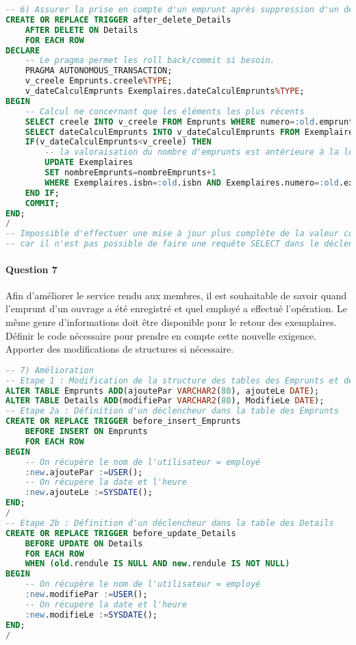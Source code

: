 \documentclass[10pt, oneside]{article}
\begin{document}
\begin{lstlisting}[language=sql, title=Question 6, label=QVI6]
-- 6) Assurer la prise en compte d'un emprunt après suppression d'un détail
CREATE OR REPLACE TRIGGER after_delete_Details
	AFTER DELETE ON Details
	FOR EACH ROW
DECLARE
	-- Le pragma permet les roll back/commit si besoin.
	PRAGMA AUTONOMOUS_TRANSACTION;
	v_creele Emprunts.creele%TYPE;
	v_dateCalculEmprunts Exemplaires.dateCalculEmprunts%TYPE;
BEGIN
	-- Calcul ne concernant que les éléments les plus récents
	SELECT creele INTO v_creele FROM Emprunts WHERE numero=:old.emprunt;
	SELECT dateCalculEmprunts INTO v_dateCalculEmprunts FROM Exemplaires WHERE Exemplaires.isbn=:old.isbn AND Exemplaires.numero=:old.exemplaire;
	IF(v_dateCalculEmprunts<v_creele) THEN 
		-- la valoraisation du nombre d'emprunts est antérieure à la location
		UPDATE Exemplaires
		SET nombreEmprunts=nombreEmprunts+1
		WHERE Exemplaires.isbn=:old.isbn AND Exemplaires.numero=:old.exemplaire;
	END IF;
	COMMIT;
END;
/
-- Impossible d'effectuer une mise à jour plus complète de la valeur contenue dans la colonne NombreEmprunts 
-- car il n'est pas possible de faire une requête SELECT dans le déclencheur
\end{lstlisting}


\paragraph{Question 7} Afin d'améliorer le service rendu aux membres, il est souhaitable de savoir quand l'emprunt d'un ouvrage a été enregistré et quel employé a effectué l'opération. Le même genre d'informations doit être disponible pour le retour des exemplaires.
Définir le code nécessaire pour prendre en compte cette nouvelle exigence. Apporter des modifications de structures si nécessaire.

\begin{lstlisting}[language=sql, title=Question 7, label=QVI7]
-- 7) Amélioration
-- Etape 1 : Modification de la structure des tables des Emprunts et des Details en y ajoutant une colonne pour conserver le nom de l'utilisateur et une autre pour conserver la date et l'heure de l'opération
ALTER TABLE Emprunts ADD(ajoutePar VARCHAR2(80), ajouteLe DATE);
ALTER TABLE Details ADD(modifiePar VARCHAR2(80), ModifieLe DATE);
-- Etape 2a : Définition d'un déclencheur dans la table des Emprunts
CREATE OR REPLACE TRIGGER before_insert_Emprunts
	BEFORE INSERT ON Emprunts
	FOR EACH ROW
BEGIN
	-- On récupère le nom de l'utilisateur = employé
	:new.ajoutePar :=USER();
	-- On récupère la date et l'heure 
	:new.ajouteLe :=SYSDATE();
END;
/
-- Etape 2b : Définition d'un déclencheur dans la table des Details
CREATE OR REPLACE TRIGGER before_update_Details
	BEFORE UPDATE ON Details
	FOR EACH ROW
	WHEN (old.rendule IS NULL AND new.rendule IS NOT NULL)
BEGIN
	-- On récupère le nom de l'utilisateur = employé
	:new.modifiePar :=USER();
	-- On récupère la date et l'heure 
	:new.modifieLe :=SYSDATE();
END;
/
\end{lstlisting}
\end{document}
